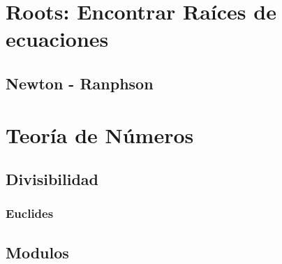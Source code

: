 \documentclass[12pt, fleqn]{report}                             %
\theoremstyle{break}                                            %
\begin{document}
    \chapter{Roots: Encontrar Raíces de ecuaciones}

        \section{Newton - Ranphson}


    
    \clearpage
    \chapter{Teoría de Números}

        \section{Divisibilidad}

            \subsection{Euclides}

        \section{Modulos}

\end{document}
